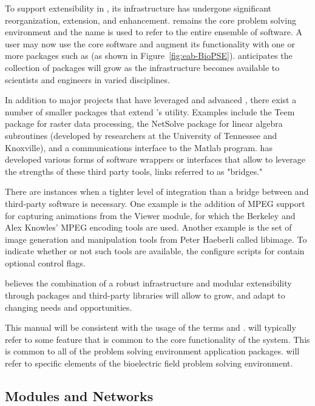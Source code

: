 To support extensibility in \sr{}, its infrastructure has undergone
significant reorganization, extension, and enhancement. \SR{} remains
the core problem solving environment and the name is used to refer to
the entire ensemble of software.  A user may now use the core \SR{}
software and augment its functionality with one or more packages such
as \BIOPSE{} (as shown in Figure~\ref{fig:eab-BioPSE}).  \sci{}
anticipates the collection of packages will grow as the \SR{}
infrastructure becomes available to scientists and engineers in varied
disciplines.

In addition to major projects that have leveraged and
advanced \SR{}, there exist a number of smaller packages that extend
\SR{}'s utility.  Examples include the Teem package for raster data
processing, the NetSolve package for linear algebra subroutines
(developed by researchers at the University of Tennessee and
Knoxville), and a communications interface to the Matlab program.  \SCI{}
has developed various forms of software wrappers or interfaces that
allow \SR{} to leverage the strengths of these third party tools,
links referred to as "bridges."

There are instances when a tighter level of integration than a
bridge between \SR{} and third-party software is necessary.  One example
is the addition of MPEG support for capturing animations from the \SR{}
Viewer module, for which the Berkeley and Alex Knowles' MPEG
encoding tools are used.  Another example is the set of image generation and
manipulation tools from Peter Haeberli called libimage.  To indicate
whether or not such tools are available, the configure scripts for \SR{}
contain optional control flags.

\sci{} believes the combination of a robust infrastructure and modular
extensibility through packages and third-party libraries will allow \SR{}
to grow, and adapt to changing needs and opportunities. 

This manual will be consistent with the usage of the
terms \SR{} and \BIOPSE{}.  \sr{} will typically refer to some feature that
is common to the core functionality of the system. This is common to all
of the problem solving environment application packages.  \BIOPSE{} will
refer to specific elements of the bioelectric field problem solving
environment.


\subsection{\SR{} Modules and Networks}
\label{sec:con-modules} 

